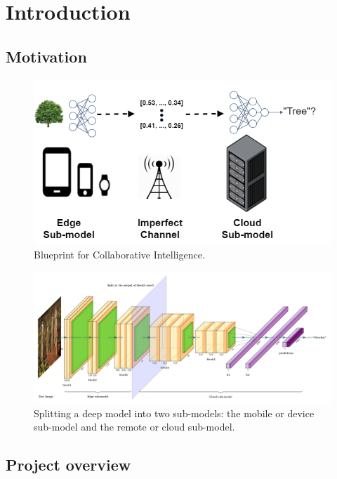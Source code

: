 \chapter{Introduction} \label{chapter:intro}

\section{Motivation}

\begin{figure}[H]
	\centering
	\includegraphics[scale=0.5]{Figures/image--000.png}
	\caption{Blueprint for Collaborative Intelligence.\cite{neurosurgeon}}
	\label{fig:ci}
\end{figure}

\begin{figure}[H]
	\centering
	\includegraphics[scale = 0.4]{Figures/vgg16CI.pdf}
	\caption{Splitting a deep model into two sub-models: the mobile or device sub-model and the remote or cloud sub-model.}
	\label{fig:splitting}
\end{figure}

\section{Project overview}
